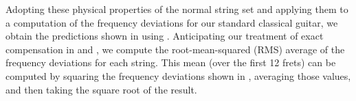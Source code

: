 Adopting these physical properties of the normal string set and applying them to a computation of the frequency deviations for our standard classical guitar, we obtain the predictions shown in  using . Anticipating our treatment of exact compensation in  and , we compute the root-mean-squared (RMS) average of the frequency deviations for each string. This mean (over the first 12 frets) can be computed by squaring the frequency deviations shown in , averaging those values, and then taking the square root of the result.

